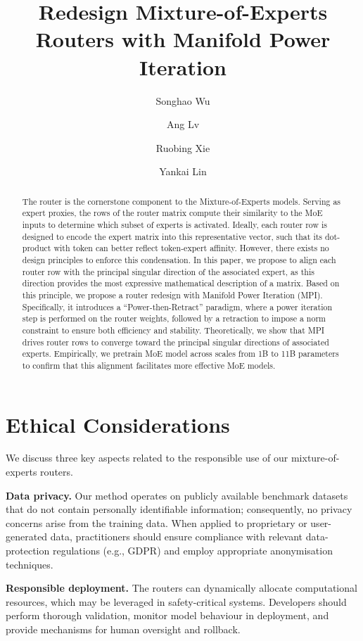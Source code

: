 \documentclass{llmxive}
\title{Redesign Mixture-of-Experts Routers with Manifold Power Iteration}
\author{Songhao Wu \and Ang Lv \and Ruobing Xie \and Yankai Lin}
\begin{document}
\maketitle
\begin{abstract}
The router is the cornerstone component to the Mixture-of-Experts models.
Serving as expert proxies, the rows of the router matrix compute their similarity to the MoE inputs to determine which subset of experts is activated.
Ideally, each router row is designed to encode the  expert matrix into this representative vector, such that its dot-product with token can better reflect token-expert affinity.
However, there exists no design principles to enforce this condensation.
In this paper, we propose to align each router row with the principal singular direction of the associated expert, as this direction provides the most expressive mathematical description of a matrix.
Based on this principle, we propose a router redesign with Manifold Power Iteration (MPI).
Specifically, it introduces a ``Power-then-Retract'' paradigm, where a power iteration step is performed on the router weights, followed by a retraction to impose a norm constraint to ensure both efficiency and stability.
Theoretically, we show that MPI drives router rows to converge toward the principal singular directions of associated experts.
Empirically, we pretrain MoE model across scales from 1B to 11B parameters to confirm that this alignment facilitates more effective MoE models.
\end{abstract}
\section{Ethical Considerations}
We discuss three key aspects related to the responsible use of our mixture-of-experts routers.

\textbf{Data privacy.} Our method operates on publicly available benchmark datasets that do not contain personally identifiable information; consequently, no privacy concerns arise from the training data. When applied to proprietary or user-generated data, practitioners should ensure compliance with relevant data-protection regulations (e.g., GDPR) and employ appropriate anonymisation techniques.

\textbf{Responsible deployment.} The routers can dynamically allocate computational resources, which may be leveraged in safety-critical systems. Developers should perform thorough validation, monitor model behaviour in deployment, and provide mechanisms for human oversight and rollback.
\end{document}
